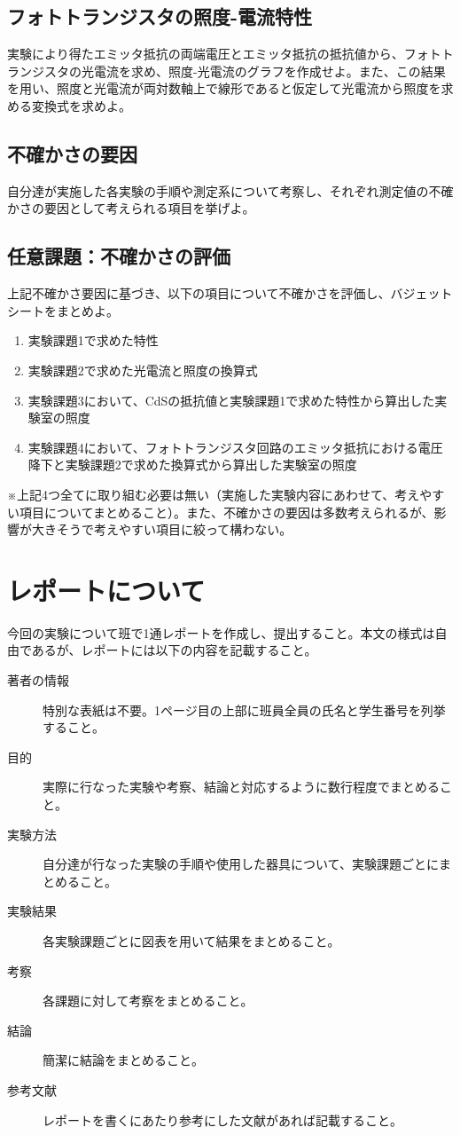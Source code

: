 \documentclass[11pt,a4paper]{jsarticle}
\begin{document}
\subsection{フォトトランジスタの照度-電流特性}
実験により得たエミッタ抵抗の両端電圧とエミッタ抵抗の抵抗値から、フォトトランジスタの光電流を求め、照度-光電流のグラフを作成せよ。また、この結果を用い、照度と光電流が両対数軸上で線形であると仮定して光電流から照度を求める変換式を求めよ。

\subsection{不確かさの要因}
自分達が実施した各実験の手順や測定系について考察し、それぞれ測定値の不確かさの要因として考えられる項目を挙げよ。
\subsection{任意課題：不確かさの評価}
上記不確かさ要因に基づき、以下の項目について不確かさを評価し、バジェットシートをまとめよ。

\begin{enumerate}
    \item 実験課題1で求めた特性
    \item 実験課題2で求めた光電流と照度の換算式
    \item 実験課題3において、CdSの抵抗値と実験課題1で求めた特性から算出した実験室の照度
    \item 実験課題4において、フォトトランジスタ回路のエミッタ抵抗における電圧降下と実験課題2で求めた換算式から算出した実験室の照度
\end{enumerate}
※上記4つ全てに取り組む必要は無い（実施した実験内容にあわせて、考えやすい項目についてまとめること）。また、不確かさの要因は多数考えられるが、影響が大きそうで考えやすい項目に絞って構わない。

\vspace{3mm}

\section{レポートについて}
今回の実験について班で1通レポートを作成し、提出すること。本文の様式は自由であるが、レポートには以下の内容を記載すること。

\begin{description}
    \item[著者の情報] 特別な表紙は不要。1ページ目の上部に班員全員の氏名と学生番号を列挙すること。
    \item[目的] 実際に行なった実験や考察、結論と対応するように数行程度でまとめること。
    \item[実験方法] 自分達が行なった実験の手順や使用した器具について、実験課題ごとにまとめること。
    \item[実験結果] 各実験課題ごとに図表を用いて結果をまとめること。
    \item[考察] 各課題に対して考察をまとめること。
    \item[結論] 簡潔に結論をまとめること。
    \item[参考文献] レポートを書くにあたり参考にした文献があれば記載すること。
\end{description}
\end{document}
